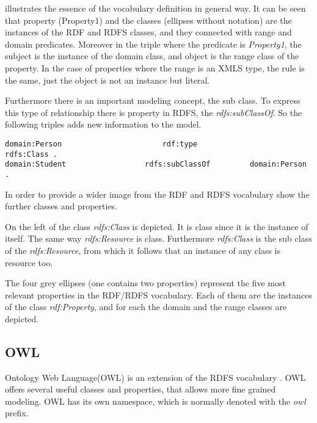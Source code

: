  illustrates the essence of the vocabulary definition in general way. It can be seen that property (Property1) and the classes (ellipses without notation) are the instances of the RDF and RDFS classes, and they connected with range and domain predicates. Moreover in the triple where the predicate is \textit{Property1}, the subject is the instance of the domain class, and object is the range class of the property. In the case of properties where the range is an XMLS type, the rule is the same, just the object is not an instance but literal.



Furthermore there is an important modeling concept, the sub class. To express this type of relationship there is property in RDFS, the \textit{rdfs:subClassOf}. So the following triples adds new information to the model.

\begin{lstlisting}[basicstyle=\footnotesize, captionpos=b, caption=Sub class definition, label=lst:sparql,
frame=single]
domain:Person						rdf:type						rdfs:Class .
domain:Student					rdfs:subClassOf			domain:Person .
\end{lstlisting}

In order to provide a wider image from the RDF and RDFS vocabulary  show the further classes and properties.




On the left of  the class \textit{rdfs:Class} is depicted. It is class since it is the instance of itself. The same way \textit{rdfs:Resource} is class. Furthermore \textit{rdfs:Class} is the sub class of the \textit{rdfs:Resource}, from which it follows that an instance of any class is resource too. 

The four grey ellipses (one contains two properties) represent the five most relevant properties in the RDF/RDFS vocabulary. Each of them are the instances of the class \textit{rdf:Property}, and for each the domain and the range classes are depicted.

\subsection{OWL}

Ontology Web Language(OWL) is an extension of the RDFS vocabulary \cite{Dean:04:OWO}. OWL offers several useful classes and properties, that allows more fine grained modeling. OWL has its own namespace, which is normally denoted with the \textit{owl} prefix.

